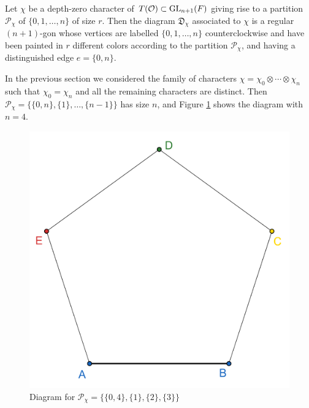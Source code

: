
    \begin{definition}
        Let $\chi$ be a depth-zero character of $T(\mathcal{O})\subset\mathrm{GL}_{n+1}(F)$ giving rise to a partition $\mathcal{P}_\chi$ of $\{0,1,\ldots,n\}$ of size $r$. Then the diagram $\mathfrak{D}_\chi$ associated to $\chi$ is a regular $(n+1)$-gon whose vertices are labelled $\{0,1,\ldots,n\}$ counterclockwise and have been painted in $r$ different colors according to the partition $\mathcal{P}_\chi$, and having a distinguished edge $e=\{0,n\}$.
    \end{definition}


    \begin{example}
        In the previous section we considered the family of characters $\chi=\chi_0\otimes\cdots\otimes\chi_n$ such that $\chi_0=\chi_n$ and all the remaining characters are distinct. Then $\mathcal{P}_\chi=\{\{0,n\},\{1\},\ldots,\{n-1\}\}$ has size $n$, and Figure \ref{fig_diagn4} shows the diagram with $n=4$.
        \begin{figure}[h]
            \begin{center}
                \includegraphics[scale=0.8]{geogebra-export.png}
                \caption{Diagram for $\mathcal{P}_\chi=\{\{0,4\},\{1\},\{2\},\{3\}\}$}
                \label{fig_diagn4}
            \end{center}
        \end{figure}
    \end{example}


